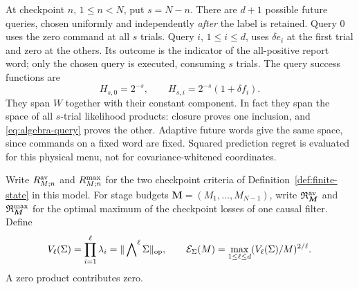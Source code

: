 \documentclass[11pt]{amsart}
\theoremstyle{definition}\newtheorem{definition}[theorem]{Definition}
\theoremstyle{remark}\newtheorem{remark}[theorem]{Remark}
\begin{document}
At checkpoint $n$, $1\le n<N$, put $s=N-n$. There are $d+1$ possible
future queries, chosen uniformly and independently \emph{after} the
label is retained. Query $0$ uses the zero command at all $s$ trials.
Query $i$, $1\le i\le d$, uses $\delta e_i$ at the first trial and
zero at the others. Its outcome is the indicator of the all-positive
report word; only the chosen query is executed, consuming $s$ trials.
The query success functions are
\begin{equation}\label{eq:algebra-query}
 H_{s,0}=2^{-s},\qquad H_{s,i}=2^{-s}(1+\delta f_i).
\end{equation}
They span $W$ together with their constant component. In fact they span
the space of all $s$-trial likelihood products: closure proves one
inclusion, and \eqref{eq:algebra-query} proves the other. Adaptive
future words give the same space, since commands on a fixed word are
fixed. Squared prediction regret is evaluated for this physical menu,
not for covariance-whitened coordinates.

Write $R^{\rm av}_{M;n}$ and $R^{\rm max}_{M;n}$ for the two
checkpoint criteria of Definition~\ref{def:finite-state} in this model.
For stage budgets $\boldsymbol M=(M_1,\ldots,M_{N-1})$, write
$\mathfrak R^{\rm av}_{\boldsymbol M}$ and
$\mathfrak R^{\rm max}_{\boldsymbol M}$ for the optimal maximum of
the checkpoint losses of one causal filter. Define
\begin{equation}\label{eq:algebra-profile}
 V_\ell(\Sigma)=\prod_{i=1}^\ell\lambda_i
       =\|\mathop{\bigwedge}\nolimits^\ell\Sigma\|_{\rm op},
 \qquad
 \mathcal E_\Sigma(M)=\max_{1\le\ell\le d}
                   (V_\ell(\Sigma)/M)^{2/\ell}.
\end{equation}
A zero product contributes zero.
\end{document}
